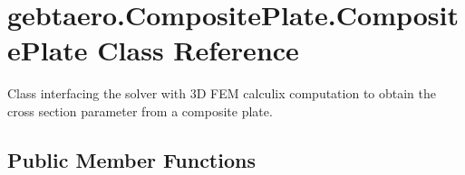 \hypertarget{classgebtaero_1_1_composite_plate_1_1_composite_plate}{}\section{gebtaero.\+Composite\+Plate.\+Composite\+Plate Class Reference}
\label{classgebtaero_1_1_composite_plate_1_1_composite_plate}


Class interfacing the solver with 3D F\+EM calculix computation to obtain the cross section parameter from a composite plate.  


\subsection*{Public Member Functions}
